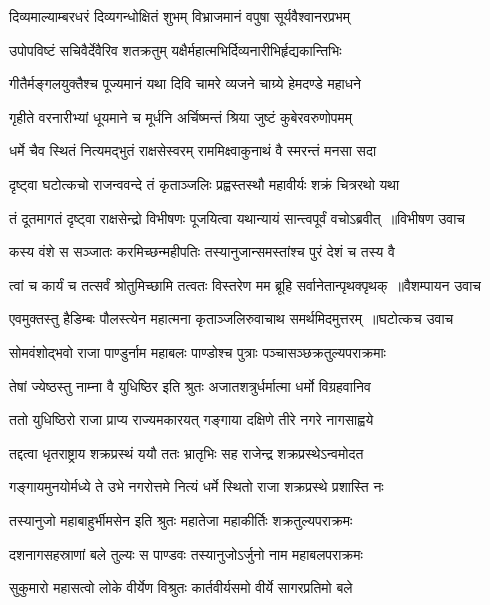 \twolineshloka
{दिव्यमाल्याम्बरधरं दिव्यगन्धोक्षितं शुभम्}
{विभ्राजमानं वपुषा सूर्यवैश्वानरप्रभम्}


\twolineshloka
{उपोपविष्टं सचिवैर्देवैरिव शतक्रतुम्}
{यक्षैर्महात्मभिर्दिव्यनारीभिर्हृद्यकान्तिभिः}


\twolineshloka
{गीतैर्मङ्गलयुक्तैश्च पूज्यमानं यथा दिवि}
{चामरे व्यजने चाग्र्ये हेमदण्डे महाधने}


\twolineshloka
{गृहीते वरनारीभ्यां धूयमाने च मूर्धनि}
{अर्चिष्मन्तं श्रिया जुष्टं कुबेरवरुणोपमम्}


\twolineshloka
{धर्मे चैव स्थितं नित्यमद्भुतं राक्षसेस्वरम्}
{राममिक्ष्वाकुनाथं वै स्मरन्तं मनसा सदा}


\twolineshloka
{दृष्ट्वा घटोत्कचो राजन्ववन्दे तं कृताञ्जलिः}
{प्रह्वस्तस्थौ महावीर्यः शक्रं चित्ररथो यथा}


\twolineshloka
{तं दूतमागतं दृष्ट्वा राक्षसेन्द्रो विभीषणः}
{पूजयित्वा यथान्यायं सान्त्वपूर्वं वचोऽब्रवीत् ॥विभीषण उवाच}


\twolineshloka
{कस्य वंशे स सञ्जातः करमिच्छन्महीपतिः}
{तस्यानुजान्समस्तांश्च पुरं देशं च तस्य वै}


\threelineshloka
{त्वां च कार्यं च तत्सर्वं श्रोतुमिच्छामि तत्वतः}
{विस्तरेण मम ब्रूहि सर्वानेतान्पृथक्पृथक् ॥वैशम्पायन उवाच}
{}


\threelineshloka
{एवमुक्तस्तु हैडिम्बः पौलस्त्येन महात्मना}
{कृताञ्जलिरुवाचाथ समर्थमिदमुत्तरम् ॥घटोत्कच उवाच}
{}


\twolineshloka
{सोमवंशोद्भवो राजा पाण्डुर्नाम महाबलः}
{पाण्डोश्च पुत्राः पञ्चासञ्छक्रतुल्यपराक्रमाः}


\twolineshloka
{तेषां ज्येष्ठस्तु नाम्ना वै युधिष्ठिर इति श्रुतः}
{अजातशत्रुर्धर्मात्मा धर्मो विग्रहवानिव}


\twolineshloka
{ततो युधिष्ठिरो राजा प्राप्य राज्यमकारयत्}
{गङ्गाया दक्षिणे तीरे नगरे नागसाह्वये}


\twolineshloka
{तद्दत्वा धृतराष्ट्राय शक्रप्रस्थं ययौ ततः}
{भ्रातृभिः सह राजेन्द्र शक्रप्रस्थेऽन्वमोदत}


\twolineshloka
{गङ्गायमुनयोर्मध्ये ते उभे नगरोत्तमे}
{नित्यं धर्मे स्थितो राजा शक्रप्रस्थे प्रशास्ति नः}


\twolineshloka
{तस्यानुजो महाबाहुर्भीमसेन इति श्रुतः}
{महातेजा महाकीर्तिः शक्रतुल्यपराक्रमः}


\twolineshloka
{दशनागसहस्राणां बले तुल्यः स पाण्डवः}
{तस्यानुजोऽर्जुनो नाम महाबलपराक्रमः}


\twolineshloka
{सुकुमारो महासत्वो लोके वीर्येण विश्रुतः}
{कार्तवीर्यसमो वीर्ये सागरप्रतिमो बले}


